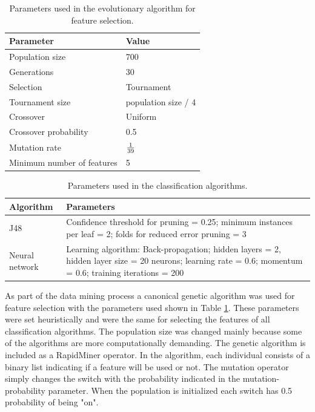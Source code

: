 \documentclass[a4paper,twoside]{article}
\begin{document}
\begin{table}[h!tb]
\centering
\caption{Parameters used in the evolutionary algorithm for feature
  selection.}
\label{tab_ga}
    \begin{tabular}{ | l | l | }
      \hline
      Parameter & Value \\
      \hline
      Population size & 700 \\
      Generations & 30 \\
      Selection & Tournament \\
      Tournament size & population size / 4 \\
      Crossover & Uniform \\
      Crossover probability & 0.5 \\
      Mutation rate & $1 \over 39$ \\
      Minimum number of features & 5 \\
            \hline

    \end{tabular}
  \end{table}
  \begin{table}[h!tb]
\centering
\caption{Parameters used in the classification algorithms.}
\label{tab_clas}
\begin{tabular}{ | l | p{10cm} | }
  \hline
  Algorithm & Parameters \\
  \hline
  J48 & Confidence threshold for pruning = 0.25; minimum instances per
        leaf = 2; folds for reduced error pruning = 3 \\
  Neural network & Learning algorithm: Back-propagation; hidden layers
                   = 2, hidden layer size = 20 neurons; learning rate
                   = 0.6; momentum = 0.6; training iterations = 200 \\
  \hline
\end{tabular}
\end{table}
%
As part of the data mining process a canonical genetic algorithm was used for feature
selection with the parameters used shown in Table \ref{tab_ga}. These
parameters were set heuristically and were the same for selecting the
features of all classification algorithms. The population size was changed
mainly because some of the algorithms are more computationally demanding. The
genetic algorithm is included as a RapidMiner operator. In the algorithm, each
individual consists of a binary list indicating if a feature will be used or
not. The mutation operator simply changes the switch with the probability
indicated in the mutation-probability parameter.  When the population is
initialized each switch has 0.5 probability of being "on".
 
\end{document}
